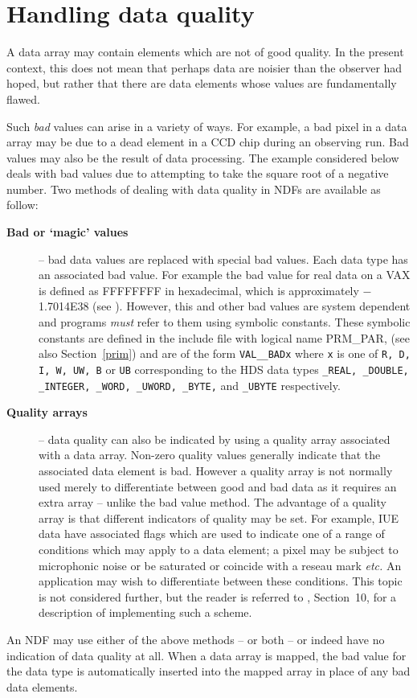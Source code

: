 \documentclass[twoside,11pt,nolof]{starlink}
\begin{document}
\newpage
\section{Handling data quality\label{badpix}}

A data array may contain elements which are not of good quality.
In the present context, this does not mean that perhaps data are noisier than
the observer had hoped,
but rather that there are data elements whose values are fundamentally
flawed.

Such {\sl bad\/} values can arise in a variety of ways.
For example, a bad pixel in a  data array may be due to a dead element
in a CCD chip during an observing run.
Bad values may also be the result of data processing.
The example considered below deals with bad values due to
attempting to take the square root of a negative number.
Two methods of dealing with data quality in NDFs are
available as follow:
\begin{description}
\item[\textbf{Bad or `magic' values}] -- bad data values are replaced with special
bad values. Each data type has an associated bad value. For example
the bad value for real data on a VAX is defined as
FFFFFFFF in hexadecimal,  which is approximately  $-$1.7014E38
(see ).
However, this and other bad values are system
dependent and programs {\sl must\/} refer to them using symbolic
constants. These symbolic constants are defined in the include file with
logical name PRM\_PAR, (see also Section~\ref{prim}) and are of the form \texttt{VAL\_\_BADx} where \texttt{x}
is one of \texttt{R, D, I, W, UW, B} or \texttt{UB}  corresponding to the
HDS data types \texttt{\_REAL,
\_DOUBLE, \_INTEGER, \_WORD, \_UWORD, \_BYTE,} and {\tt\_UBYTE} respectively.
\item[\textbf{Quality arrays}] -- data quality can also be indicated by
using a quality array associated with a data array.
Non-zero quality values generally indicate that the
associated data element is bad.
However a quality array is not normally used merely to
differentiate between good
and bad data as it requires an extra array -- unlike the bad value method.
The advantage of a quality array is that different indicators of
quality may be set. For example, IUE data have associated flags which
are used to indicate one of a range of conditions which may apply to a
data element; a pixel may be subject to microphonic noise
or be saturated or coincide with a reseau mark \textit{etc.}
An application may wish to differentiate between these conditions.
This topic is not considered further, but the reader is referred to
,
Section~10, for a description of implementing such a scheme.
\end{description}
An NDF may use either of the above methods -- or both  -- or indeed
have no indication of data quality at all.
When a data array is mapped,
the bad value for the data type
is automatically inserted into the mapped array in place of any
bad data elements.
\end{document}
